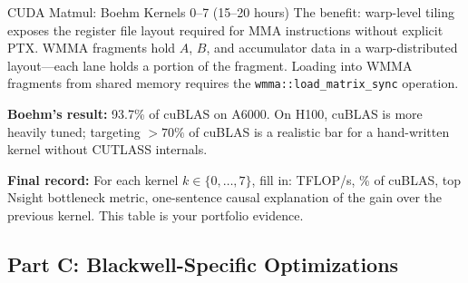\begin{exercise}{CUDA Matmul: Boehm Kernels 0--7 (15--20 hours)}
The benefit: warp-level tiling exposes the register file layout required for MMA instructions without explicit PTX. WMMA fragments hold $A$, $B$, and accumulator data in a warp-distributed layout---each lane holds a portion of the fragment. Loading into WMMA fragments from shared memory requires the \texttt{wmma::load\_matrix\_sync} operation.

\textbf{Boehm's result:} 93.7\% of cuBLAS on A6000. On H100, cuBLAS is more heavily tuned; targeting $>70\%$ of cuBLAS is a realistic bar for a hand-written kernel without CUTLASS internals.

\textbf{Final record:} For each kernel $k \in \{0, \ldots, 7\}$, fill in: TFLOP/s, \% of cuBLAS, top Nsight bottleneck metric, one-sentence causal explanation of the gain over the previous kernel. This table is your portfolio evidence.
\end{exercise}

\subsection{Part C: Blackwell-Specific Optimizations}

